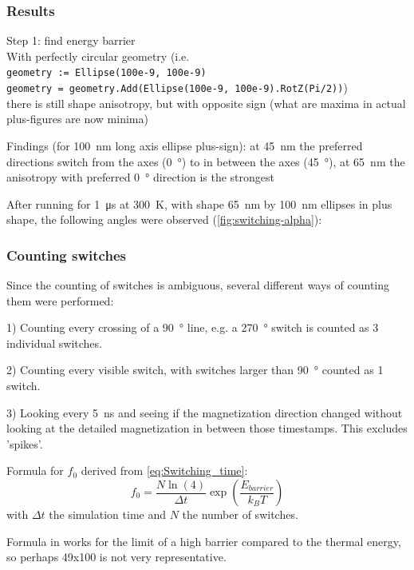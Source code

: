 \documentclass[10pt,a4paper]{article}
\newcommand{\code}[1]{\texttt{#1}}
\begin{document}
\subsubsection{Results}
Step 1: find energy barrier \\
With perfectly circular geometry (i.e. \\
\code{geometry := Ellipse(100e-9, 100e-9)} \\
\code{geometry = geometry.Add(Ellipse(100e-9, 100e-9).RotZ(Pi/2))}) \\
there is still shape anisotropy, but with opposite sign (what are maxima in actual plus-figures are now minima)

Findings (for \SI{100}{\nano\metre} long axis ellipse plus-sign):
at \SI{45}{\nano\metre} the preferred directions switch from the axes (\SI{0}{\degree}) to in between the axes (\SI{45}{\degree}),
at \SI{65}{\nano\metre} the anisotropy with preferred \SI{0}{\degree} direction is the strongest

After running for \SI{1}{\micro\second} at \SI{300}{\kelvin}, with shape \SI{65}{\nano\metre} by \SI{100}{\nano\metre} ellipses in plus shape, the following angles were observed (\cref{fig:switching-alpha}):


\subsubsection{Counting switches}
Since the counting of switches is ambiguous, several different ways of counting them were performed:

1) Counting every crossing of a \SI{90}{\degree} line, e.g. a \SI{270}{\degree} switch is counted as 3 individual switches.

2) Counting every visible switch, with switches larger than \SI{90}{\degree} counted as 1 switch.

3) Looking every \SI{5}{\nano\second} and seeing if the magnetization direction changed without looking at the detailed magnetization in between those timestamps. This excludes 'spikes'.

Formula for $f_0$ derived from \eqref{eq:Switching_time}:
\begin{equation*}
    f_0 = \frac{N \ln(4)}{\Delta t} \exp(\frac{E_{barrier}}{k_B T})
\end{equation*}
with $\Delta t$ the simulation time and $N$ the number of switches.

Formula in \cite{MuMax3} works for the limit of a high barrier compared to the
thermal energy, so perhaps 49x100 is not very representative.
\end{document}
